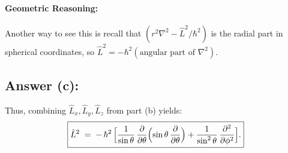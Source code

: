 \documentclass[12pt]{article}
\begin{document}
\paragraph{Geometric Reasoning:} Another way to see this is recall that $(r^2\nabla^2 - \hat{L}^2/\hbar^2)$ is the radial part in spherical coordinates, so $\hat{L}^2 = -\hbar^2(\text{angular part of }\nabla^2)$.

\subsection*{Answer (c):}
Thus, combining $\hat{L}_x,\hat{L}_y,\hat{L}_z$ from part (b) yields:
\begin{equation}
\boxed{
\hat{L}^2\;=\;-\,\hbar^2\,\Bigl[\frac{1}{\sin\theta}\,\frac{\partial}{\partial \theta}\Bigl(\sin\theta\,\frac{\partial}{\partial \theta}\Bigr) + \frac{1}{\sin^2\theta}\,\frac{\partial^2}{\partial \phi^2}\Bigr].
}
\end{equation}
\end{document}
